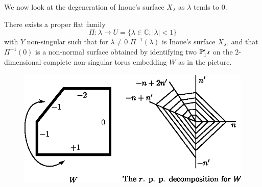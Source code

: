We now look at the   degeneration of Inoue's surface $X_\lambda$ as
$\lambda$ tends to 0. 

\begin{theorem}\label{chap2:thm14.3}%
There exists a proper flat family
$$
\Pi : \lambda \longrightarrow U = \{ \lambda \in
\mathbb{C}  ; | \lambda | < 1\} 
$$
with $Y$ non-singular such that for $\lambda \neq 0$ \;\;
$\Pi^{-1}(\lambda)$ is Inoue's surface $X_\lambda$, and that
$\Pi^{-1}(0)$ is a non-normal surface obtained by identifying two 
$\varmathbb{P}_1 's$ on the 2-dimensional complete non-singular
torus embedding $W$  as in the picture. 
\begin{figure}[H]
\centering 
\includegraphics{vol58-fig/fig58-77.eps} 
\end{figure}
\end{theorem}

